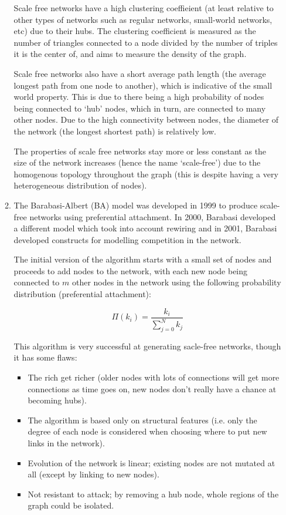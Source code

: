\documentclass{report}
\begin{document}
\begin{enumerate}
\begin{enumerate}
    Scale free networks have a high clustering coeffieient (at least
    relative to other types of networks such as regular networks,
    small-world networks, etc) due to their hubs. The clustering
    coefficient is measured as the number of triangles connected to a
    node divided by the number of triples it is the center of, and
    aims to measure the density of the graph.

    Scale free networks also have a short average path length (the
    average longest path from one node to another), which is
    indicative of the small world property. This is due to there being
    a high probability of nodes being connected to `hub' nodes, which
    in turn, are connected to many other nodes. Due to the high
    connectivity between nodes, the diameter of the network (the
    longest shortest path) is relatively low.

    The properties of scale free networks stay more or less constant
    as the size of the network increases (hence the name `scale-free')
    due to the homogenous topology throughout the graph (this is
    despite having a very heterogeneous distribution of nodes).
  \item The Barabasi-Albert (BA) model was developed in 1999 to
    produce scale-free networks using preferential attachment. In
    2000, Barabasi developed a different model which took into account
    rewiring and in 2001, Barabasi developed constructs for modelling
    competition in the network.

    The initial version of the algorithm starts with a small set of
    nodes and proceeds to add nodes to the network, with each new node
    being connected to $m$ other nodes in the network using the
    following probability distribution (preferential attachment):

    \[
      \Pi(k_i) = \frac{k_i}{\sum\limits^N_{j=0}k_j}
    \]

    This algorithm is very successful at generating sacle-free
    networks, though it has some flaws:

    \begin{itemize}
      \item The rich get richer (older nodes with lots of connections
        will get more connections as time goes on, new nodes don't
        really have a chance at becoming hubs).
      \item The algorithm is based only on structural features
        (i.e. only the degree of each node is considered when choosing
        where to put new links in the network).
      \item Evolution of the network is linear; existing nodes are not
        mutated at all (except by linking to new nodes).
      \item Not resistant to attack; by removing a hub node, whole
        regions of the graph could be isolated.
    \end{itemize}


\end{enumerate}
\end{enumerate}
\end{document}
